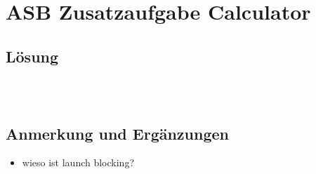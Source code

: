 \chapter{ASB Zusatzaufgabe Calculator}\label{ch:calculator}


\section{Lösung}

\begin{verbatim}

\end{verbatim}\\


\section{Anmerkung und Ergänzungen}


\begin{itemize}
    \item wieso ist launch blocking?
\end{itemize}
